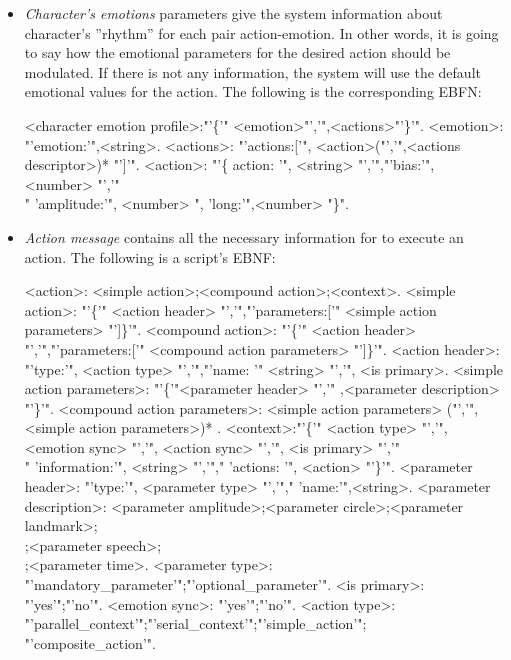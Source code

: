 \begin{itemize}
	\item \textit{Character's emotions} parameters give the system information about character's ''rhythm'' for each pair action-emotion. In other words, it is going to say how the emotional parameters for the desired action should be modulated. If there is not any information, the system will use the default emotional values for the action. The following is the corresponding EBFN:
\begin{grammar}
<character emotion profile>:"'\{'" <emotion>"','",<actions>"'\}'".
<emotion>: "'emotion:'",<string>.
<actions>: "'actions:['", <action>("','",<actions descriptor>)* "']'".
<action>: "'\{ action: '", <string> "','","'bias:'", <number> "','"\\" 'amplitude:'", <number> ", 'long:'",<number> "\}". 
\end{grammar}

	\item \textit{Action message} contains all the necessary information for to execute an action. The following is a script's EBNF:
\begin{grammar}
<action>: <simple action>;<compound action>;<context>.
<simple action>: "'\{'" <action header> "','","'parameters:['" <simple action parameters> "']\}'".
<compound action>: "'\{'" <action header> "','","'parameters:['" <compound action parameters> "']\}'".
<action header>: "'type:'", <action type> "','","'name: '" <string>  "','", <is primary>.
<simple action parameters>: "'\{'"<parameter header> "','" ,<parameter description> "'\}'". 
<compound action parameters>:  <simple action parameters> ("','", <simple action parameters>)* .
<context>:"'\{'" <action type> "','", <emotion sync> "','", <action sync> "','", <is primary> "','"\\" 'information:'", <string> "','"," 'actions: '", <action> "'\}'".
<parameter header>: "'type:'", <parameter type> "','"," 'name:'",<string>.
<parameter description>: <parameter amplitude>;<parameter circle>;<parameter landmark>;\\<parameter point>;<parameter speech>;\\<parameter square>;<parameter time>.
<parameter type>: "'mandatory\_parameter'";"'optional\_parameter'". 
<is primary>: "'yes'";"'no'".
<emotion sync>: "'yes'";"'no'".
<action type>: "'parallel\_context'";"'serial\_context'";"'simple\_action'";\\"'composite\_action'".
\end{grammar}
\end{itemize} 